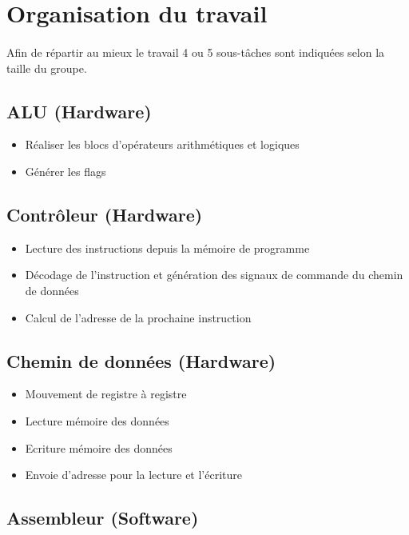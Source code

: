 \section{Organisation du travail}

\paragraph{}
	Afin de répartir au mieux le travail 4 ou 5 sous-tâches sont indiquées selon la taille du groupe.

\subsection{ALU (Hardware)}

\begin{itemize}
	\item Réaliser les blocs d'opérateurs arithmétiques et logiques
	\item Générer les flags
\end{itemize}

\subsection{Contrôleur (Hardware)}

\begin{itemize}
	\item Lecture des instructions depuis la mémoire de programme 
	\item Décodage de l'instruction et génération des signaux de commande du chemin de données
	\item Calcul de l'adresse de la prochaine instruction
\end{itemize}

\subsection{Chemin de données (Hardware)}

\begin{itemize}
	\item Mouvement de registre à registre
 	\item Lecture mémoire des données
	\item Ecriture mémoire des données
	\item Envoie d'adresse pour la lecture et l'écriture
\end{itemize}

\subsection{Assembleur (Software)}

